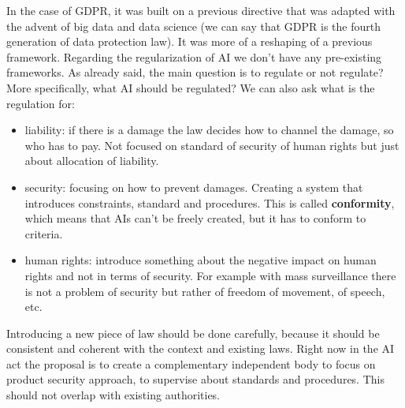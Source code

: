 In the case of GDPR, it was built on a previous directive that was adapted with the advent of big data and data science (we can say that GDPR is the fourth generation of data protection law). It was more of a reshaping of a previous framework. Regarding the regularization of AI we don't have any pre-existing frameworks. As already said, the main question is to regulate or not regulate? More specifically, what AI should be regulated? We can also ask what is the regulation for:
\begin{itemize}
    \item liability: if there is a damage the law decides how to channel the damage, so who has to pay. Not focused on standard of security of human rights but just about allocation of liability.
    \item security: focusing on how to prevent damages. Creating a system that introduces constraints, standard and procedures. This is called \textbf{conformity}, which means that AIs can't be freely created, but it has to conform to criteria.
    \item human rights: introduce something about the negative impact on human rights and not in terms of security. For example with mass surveillance there is not a problem of security but rather of freedom of movement, of speech, etc.
\end{itemize}

Introducing a new piece of law should be done carefully, because it should be consistent and coherent with the context and existing laws. 
Right now in the AI act the proposal is to create a complementary independent body to focus on product security approach, to supervise about standards and procedures. This should not overlap with existing authorities.

